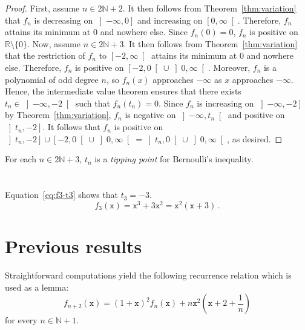 \documentclass[12pt]{article}
\newcommand{\bR}{\mathbb{R}}
\newcommand{\bN}{\mathbb{N}}
\newcommand{\gtint}[1]{\left] #1, \infty \right[}
\newcommand{\geint}[1]{\left[ #1, \infty \right[}
\newcommand{\ltint}[1]{\left]- \infty, #1 \right[}
\newcommand{\leint}[1]{\left]- \infty, #1 \right]}
\newcommand{\ttx}{\mathtt{x}}
\begin{document}
 \begin{proof}
   First,  assume $n \in  2 \bN + 2$.
   It then follows from Theorem~\ref{thm:variation} that 
   $f_n$ is decreasing on $\leint{0}$ and increasing on $\geint{0}$.
   Therefore, $f_n$ attains its minimum at $0$ and nowhere else.
   Since $f_n(0) = 0$, $f_n$ is positive on $\bR \setminus \{ 0 \}$.
   Now, assume $n \in 2 \bN + 3$.
   It then follows from Theorem~\ref{thm:variation} that
   the restriction of $f_n$ to $\geint{-2}$ attains its minimum at $0$
   and nowhere else.
   Therefore, $f_n$ is positive on $\left[- 2, 0 \right[ \cup \gtint{0}$.
   Moreover,
   $f_n$ is a polynomial of odd degree $n$, so $f_n(x)$ approaches $- \infty$ as $x$ approaches $- \infty$.
   Hence,
   the intermediate value theorem ensures that there exists $t_n \in \ltint{- 2}$ such that $f_n(t_n) = 0$.
   Since $f_n$ is increasing on $\leint{- 2}$ by Theorem~\ref{thm:variation},
   $f_n$ is negative on $\ltint{t_n}$ and positive on $\left]t_n, - 2 \right]$.
   It follows that $f_n$ is positive on  $\left]t_n, - 2 \right] \cup \left[- 2, 0 \right[ \cup \gtint{0} = \left]t_n, 0 \right[ \cup \gtint{0}$, as desired.
 \end{proof}

 For each $n \in 2 \bN + 3$, 
 $t_n$ is a \emph{tipping point} for Bernoulli's inequality.


\section{ } 

 Equation~\eqref{eq:f3-t3} shows that $t_3 = - 3$. 
 \begin{equation} \label{eq:f3-t3}
f_3(\ttx) = \ttx^3 + 3 \ttx^2 = \ttx^2 (\ttx + 3) \,.
\end{equation}



 



 \section{Previous results} 
 
 Straightforward computations yield the following recurrence relation which is used as a lemma:
 \begin{equation} \label{eq:fn+2-fn}
   f_{n + 2} (\ttx) = {(1 + \ttx)}^2 f_n(\ttx) + n \ttx^2 \left(\ttx + 2 + \frac{1}{n} \right)
 \end{equation}
 for every $n \in \bN + 1$.
 
\end{document}
